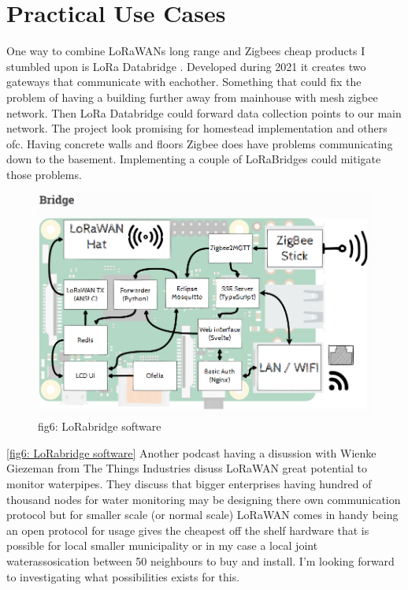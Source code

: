 \documentclass[article,a4paper]{IEEEtran}
\begin{document}
    \section{Practical Use Cases}
    One way to combine LoRaWANs long range and Zigbees cheap products I stumbled upon is LoRa Databridge \cite{LoRabridge}. Developed during 2021 it creates two gateways that communicate with eachother. Something that could fix the problem of having a building further away from mainhouse with mesh zigbee network. Then LoRa Databridge could forward data collection points to our main network. The project look promising for homestead implementation and others ofc. Having concrete walls and floors Zigbee does have problems communicating down to the basement. Implementing a couple of LoRaBridges could mitigate those problems. 
    \begin{figure}
        \includegraphics[width=\columnwidth]{LoRaBridge.png} 
        \caption{ fig6: LoRabridge software \cite{LoRaBridgeDocs} }
        \label{fig6: LoRabridge software }   
    \end{figure}
    \ref{fig6: LoRabridge software} 
    Another podcast having a disussion \cite{LoRaWANpodcast} with Wienke Giezeman from The Things Industries disuss LoRaWAN great potential to monitor waterpipes. They discuss that bigger enterprises having hundred of thousand nodes for water monitoring may be designing there own communication protocol but for smaller scale (or normal scale) LoRaWAN comes in handy being an open protocol for usage gives the cheapest off the shelf hardware that is possible for local smaller municipality or in my case a local joint waterassosication between 50 neighbours to buy and install. I'm looking forward to investigating what possibilities exists for this. 
\end{document}
